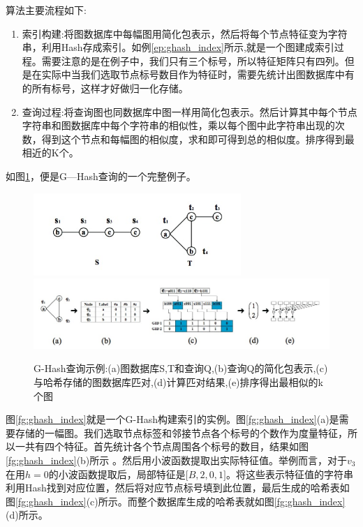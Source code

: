 \documentclass{XDBAthesis}
\begin{document}
算法主要流程如下:
\begin{enumerate}
    \item 索引构建:将图数据库中每幅图用简化包表示，然后将每个节点特征变为字符串，利用Hash存成索引。如例\ref{ep:ghash_index}所示,就是一个图建成索引过程。需要注意的是在例子中，我们只有三个标号，所以特征矩阵只有四列。但是在实际中当我们选取节点标号数目作为特征时，需要先统计出图数据库中有的所有标号，这样才好做归一化存储。
    \item 查询过程:将查询图也同数据库中图一样用简化包表示。然后计算其中每个节点字符串和图数据库中每个字符串的相似性，乘以每个图中此字符串出现的次数，得到这个节点和每幅图的相似度，求和即可得到总的相似度。排序得到最相近的K个。    
\end{enumerate}

如图\ref{fg:gHashExample}，便是G—Hash查询的一个完整例子。
\begin{figure}[htb]
    \centering
    \includegraphics[width=0.7\textwidth ]{../figures/ghashdatabase}
    \includegraphics[width=\textwidth ]{../figures/gHash+}
    \caption{G-Hash查询示例:(a)图数据库{S,T}和查询Q,(b)查询Q的简化包表示,(c)与哈希存储的图数据库匹对,(d)计算匹对结果,(e)排序得出最相似的k个图}
    \label{fg:gHashExample}
\end{figure}
\begin{exmp}
        图\ref{fg:ghash_index}就是一个G-Hash构建索引的实例。图\ref{fg:ghash_index}(a)是需要存储的一幅图。我们选取节点标签和邻接节点各个标号的个数作为度量特征，所以一共有四个特征。首先统计各个节点周围各个标号的数目，结果如图\ref{fg:ghash_index}(b)所示 。然后用小波函数提取出实际特征值。举例而言，对于$v_{3}$在用$h=0$的小波函数提取后，局部特征是$\lbrack B,2,0,1\rbrack $。将这些表示特征值的字符串利用Hash找到对应位置，然后将对应节点标号填到此位置，最后生成的哈希表如图\ref{fg:ghash_index}(c)所示。而整个数据库生成的哈希表就如图\ref{fg:ghash_index}(d)所示。
        \label{ep:ghash_index}
        
    \end{exmp}
\end{document}
